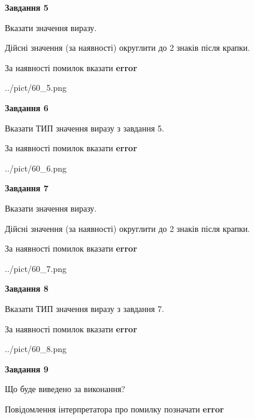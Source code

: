 \documentclass[11pt, ukrainian]{article}
\begin{document}
{\begin {large}
{\begin {center}\textbf{Завдання 5}\end {center}}\par
Вказати значення виразу. \par
Дійсні значення (за наявності) округлити до 2 знаків після крапки. \par
За наявності помилок вказати \textbf{error}

\begin{center}
	{../pict/60_5.png}
\end{center}
\newpage

{\begin {center}\textbf{Завдання 6}\end {center}}\par
Вказати ТИП значення виразу з завдання 5. \par
За наявності помилок вказати \textbf{error}

\begin{center}
	{../pict/60_6.png}
\end{center}
\newpage

{\begin {center}\textbf{Завдання 7}\end {center}}\par
Вказати значення виразу. \par
Дійсні значення (за наявності) округлити до 2 знаків після крапки. \par
За наявності помилок вказати \textbf{error}

\begin{center}
	{../pict/60_7.png}
\end{center}
\newpage

{\begin {center}\textbf{Завдання 8}\end {center}}\par
Вказати ТИП значення виразу з завдання 7. \par
За наявності помилок вказати \textbf{error}

\begin{center}
	{../pict/60_8.png}
\end{center}
\newpage

{\begin {center}\textbf{Завдання 9}\end {center}}\par
Що буде виведено за виконання? \par
Повідомлення інтерпретатора про помилку позначати \textbf{error}


\end{large}}
\end{document}
